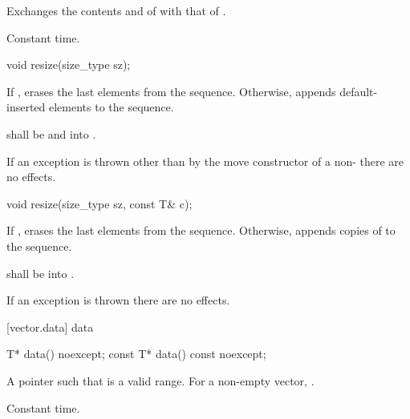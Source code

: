 \begin{itemdescr}
\pnum
\effects
Exchanges the contents and
of
with that of .

\pnum
\complexity
Constant time.
\end{itemdescr}

%
\begin{itemdecl}
void resize(size_type sz);
\end{itemdecl}

\begin{itemdescr}
\pnum
\effects If , erases the last  elements
from the sequence. Otherwise,
appends  default-inserted elements to the sequence.

\pnum
\requires {} shall be
 and  into .

\pnum
\notes If an exception is thrown other than by the move constructor of a non-
 there are no effects.
\end{itemdescr}

%
\begin{itemdecl}
void resize(size_type sz, const T& c);
\end{itemdecl}

\begin{itemdescr}
\pnum
\effects If , erases the last  elements
from the sequence. Otherwise,
appends  copies of  to the sequence.

\pnum
\requires {} shall be
 into .

\pnum
\notes If an exception is thrown there are no effects.
\end{itemdescr}

[vector.data]{ data}

%
\begin{itemdecl}
T*         data() noexcept;
const T*   data() const noexcept;
\end{itemdecl}

\begin{itemdescr}
\pnum
\returns
A pointer such that  is a valid range. For a
non-empty vector,  \tcode{==} .

\pnum
\complexity
Constant time.
\end{itemdescr}

